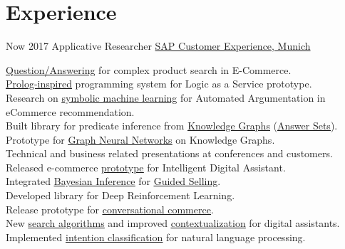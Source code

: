 \documentclass[letterpaper]{twentysecondcv} %
\begin{document}
 \makeprofile %


\section{Experience}

\begin{twenty} %
\twentyitem
    	{Now}
		{2017}
        {Applicative Researcher}
        {\href{https://cxlabs.sap.com/}{SAP Customer Experience,  Munich}}
        {}
        {
        \href{https://blogs.sap.com/2022/07/14/question-answering-in-ecommerce-search/}{\underline{Question/Answering}} for complex product search in E-Commerce.\\
        \href{https://blogs.sap.com/2022/04/26/ludwig-experimental-programming-system-for-business-services/}{\underline{Prolog-inspired}} programming system for Logic as a Service prototype.\\
        Research on \href{https://2022-eu.semantics.cc/socratic-digital-agent-persuasion-ecommerce-knowledge-logic-and-machine-learning}{\underline{symbolic machine learning}} for Automated Argumentation in eCommerce recommendation.\\
        Built library for predicate inference from \href{https://blogs.sap.com/tag/knowledge-graph/}{\underline{Knowledge Graphs}} (\href{https://blogs.sap.com/2020/11/25/rule-engines-and-knowledge-intensive-processing-with-answer-set-programming/}{\underline{Answer Sets}}).
        Prototype for \href{https://gfrison.com/2020/graph-convolution-networks}{\underline{Graph Neural Networks}} on Knowledge Graphs.\\
        Technical and business related presentations at conferences and customers.\\ 
        Released e-commerce \href{https://blogs.sap.com/tag/zefiro/}{\underline{prototype}} for Intelligent Digital Assistant.\\ 
        Integrated \href{https://github.com/sap/bayesian-network-builder}{\underline{Bayesian Inference}} for \href{https://blogs.sap.com/2020/09/22/bayesian-inference-for-guided-selling-sap-predictive-summit-talk/}{\underline{Guided Selling}}.\\
        Developed library for Deep Reinforcement Learning.\\
        Release prototype for \href{https://sapvideoa35699dc5.hana.ondemand.com/?entry_id=1_kp5hbyih}{\underline{conversational commerce}}.\\
        New \href{https://blogs.sap.com/2021/09/01/improve-conversational-commerce-search-with-knowledge-graphs/}{\underline{search algorithms}} and improved \href{https://gfrison.com/2018/03/14/stochastic-conversational-workflows/}{\underline{contextualization}}  for digital assistants. \\
        Implemented \href{https://gfrison.com/2017/09/01/deeplearning-in-text-classification/}{\underline{intention classification}} for natural language processing.
        
}
\end{twenty}
\end{document}
